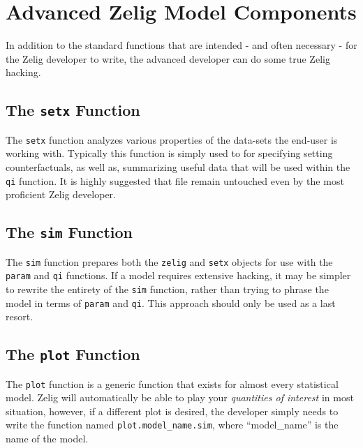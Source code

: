 \documentclass[a4paper,10pt]{article}
\begin{document}
\section{Advanced Zelig Model Components}
In addition to the standard functions that are intended - and often necessary - for the Zelig developer to write, the advanced developer can do some true Zelig hacking.

\subsection{The {\tt setx} Function}
The {\tt setx} function analyzes various properties of the data-sets the end-user is working with.  Typically this function is simply used to for specifying setting counterfactuals, as well as, summarizing useful data that will be used within the {\tt qi} function.  It is highly suggested that file remain untouched even by the most proficient Zelig developer.

\subsection{The {\tt sim} Function}
The {\tt sim} function prepares both the {\tt zelig} and {\tt setx} objects for use with the {\tt param} and {\tt qi} functions.  If a model requires extensive hacking, it may be simpler to rewrite the entirety of the {\tt sim} function, rather than trying to phrase the model in terms of {\tt param} and {\tt qi}.  This approach should only be used as a last resort.

\subsection{The {\tt plot} Function}
The {\tt plot} function is a generic function that exists for almost every statistical model.  Zelig will automatically be able to play your \emph{quantities of interest} in most situation, however, if a different plot is desired, the developer simply needs to write the function named {\tt plot.model\_name.sim}, where ``model\_name'' is the name of the model.
\end{document}

